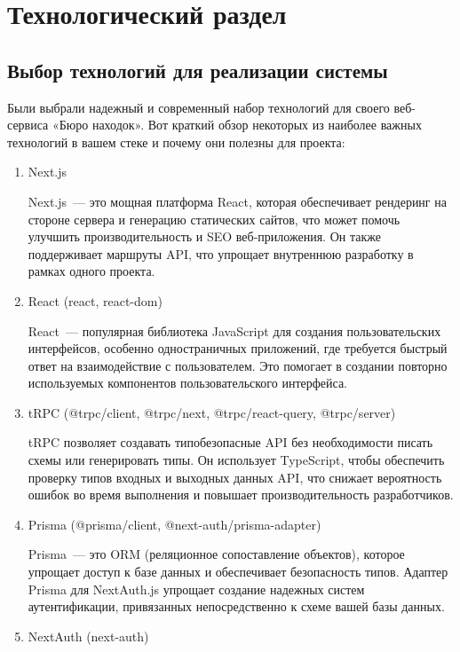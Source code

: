 \section{Технологический раздел}
\label{sec:technology}

\subsection{Выбор технологий для реализации системы}

Были выбрали надежный и современный набор технологий для своего веб-сервиса «Бюро находок». Вот краткий обзор некоторых из наиболее важных технологий в вашем стеке и почему они полезны для проекта:

\begin{enumerate}
	\item Next.js
	
	Next.js~--- это мощная платформа React, которая обеспечивает рендеринг на стороне сервера и генерацию статических сайтов, что может помочь улучшить производительность и SEO веб-приложения. Он также поддерживает маршруты API, что упрощает внутреннюю разработку в рамках одного проекта.
	
	\item React (react, react-dom)
	
	React~--- популярная библиотека JavaScript для создания пользовательских интерфейсов, особенно одностраничных приложений, где требуется быстрый ответ на взаимодействие с пользователем. Это помогает в создании повторно используемых компонентов пользовательского интерфейса.
	
	\item tRPC (@trpc/client, @trpc/next, @trpc/react-query, @trpc/server)
	
	tRPC позволяет создавать типобезопасные API без необходимости писать схемы или генерировать типы. Он использует TypeScript, чтобы обеспечить проверку типов входных и выходных данных API, что снижает вероятность ошибок во время выполнения и повышает производительность разработчиков.
	
	\item Prisma (@prisma/client, @next-auth/prisma-adapter)
	
	Prisma~--- это ORM (реляционное сопоставление объектов), которое упрощает доступ к базе данных и обеспечивает безопасность типов. Адаптер Prisma для NextAuth.js упрощает создание надежных систем аутентификации, привязанных непосредственно к схеме вашей базы данных.
	
	\item NextAuth (next-auth)
	

\end{enumerate}
